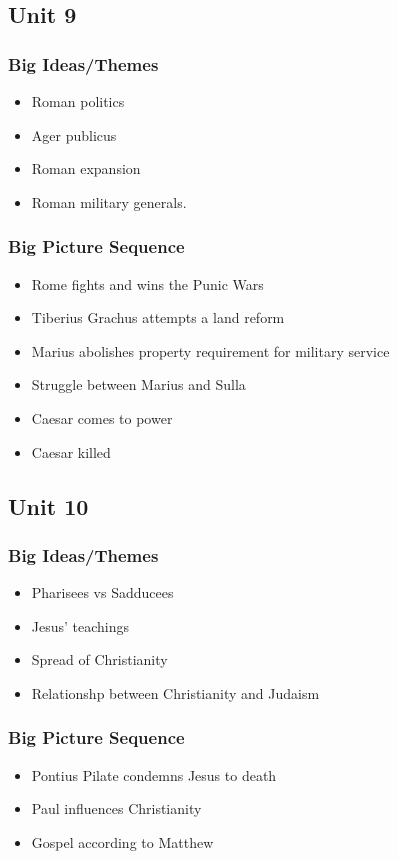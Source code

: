 \documentclass{article}
\begin{document}
\subsection*{Unit 9}
\subsubsection*{Big Ideas/Themes}
\begin{itemize}
  \item Roman politics
  \item Ager publicus
  \item Roman expansion
  \item Roman military generals.
\end{itemize}
\subsubsection*{Big Picture Sequence}
\begin{itemize}
  \item Rome fights and wins the Punic Wars
  \item Tiberius Grachus attempts a land reform
  \item Marius abolishes property requirement for military service
  \item Struggle between Marius and Sulla
  \item Caesar comes to power
  \item Caesar killed
\end{itemize}
\subsection*{Unit 10}
\subsubsection*{Big Ideas/Themes}
\begin{itemize}
  \item Pharisees vs Sadducees
  \item Jesus' teachings
  \item Spread of Christianity
  \item Relationshp between Christianity and Judaism
\end{itemize}
\subsubsection*{Big Picture Sequence}
\begin{itemize}
  \item Pontius Pilate condemns Jesus to death
  \item Paul influences Christianity
  \item Gospel according to Matthew
\end{itemize}
\end{document}
